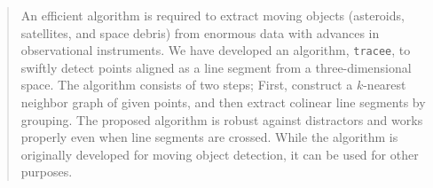 
\begin{abstract}
  An efficient algorithm is required to extract moving objects (asteroids, satellites, and space debris) from enormous data with advances in observational instruments. We have developed an algorithm, \texttt{tracee}, to swiftly detect points aligned as a line segment from a three-dimensional space. The algorithm consists of two steps; First, construct a $k$-nearest neighbor graph of given points, and then extract colinear line segments by grouping. The proposed algorithm is robust against distractors and works properly even when line segments are crossed. While the algorithm is originally developed for moving object detection, it can be used for other purposes.
\end{abstract}



